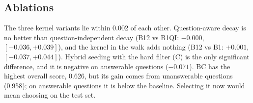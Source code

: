\begin{table}[t]
\centering
\caption{Test set (152 questions). Correct from the judge; ROUGE-L and F1 on answerable questions; $\Delta$: paired bootstrap against the reproduced baseline.}
\label{tab:main}
\end{table}

\subsection{Ablations}
The three kernel variants lie within 0.002 of each other. Question-aware decay is no better than question-independent decay (B12 vs B1QI: $-0.000$, $[-0.036, +0.039]$), and the kernel in the walk adds nothing (B12 vs B1: $+0.001$, $[-0.037, +0.044]$). Hybrid seeding with the hard filter (C) is the only significant difference, and it is negative on answerable questions ($-0.071$). BC has the highest overall score, 0.626, but its gain comes from unanswerable questions (0.958); on answerable questions it is below the baseline. Selecting it now would mean choosing on the test set.

